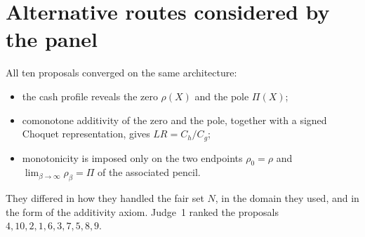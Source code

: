 \section{Alternative routes considered by the panel}

All ten proposals converged on the same architecture:
\begin{itemize}
\item the cash profile reveals the zero $\rho(X)$ and the pole $\Pi(X)$;
\item comonotone additivity of the zero and the pole, together with a signed Choquet representation, gives $LR=C_h/C_g$;
\item monotonicity is imposed only on the two endpoints $\rho_0=\rho$ and $\lim_{\beta\to\infty}\rho_\beta=\Pi$ of the associated pencil.
\end{itemize}
They differed in how they handled the fair set $N$, in the domain they used, and in the form of the additivity axiom. Judge~1 ranked the proposals $4,10,2,1,6,3,7,5,8,9$.

